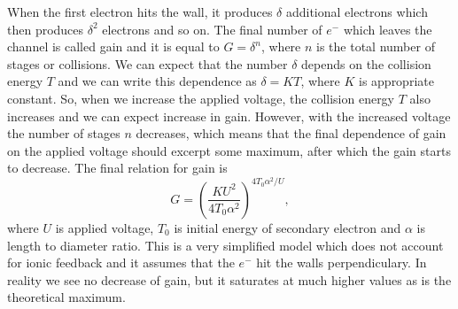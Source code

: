 When the first electron hits the wall, it produces $\delta$
additional electrons which then produces $\delta^2$ electrons and so on. The final number of $e^-$
which leaves the channel is called gain and it is equal to $G = \delta^n$, where $n$ is the total
number of stages or collisions. We can expect that the number $\delta$ depends on the collision
energy $T$ and we can write this dependence as $\delta = KT$, where $K$ is appropriate constant.
So, when we increase the applied voltage, the collision energy $T$ also increases and we can expect
increase in gain. However, with the increased voltage the number of stages $n$ decreases,
which means that the final dependence of gain on the applied voltage should excerpt some maximum,
after which the gain starts to decrease. The final relation for gain is
\begin{equation}
    G = \left(\frac{KU^2}{4T_0\alpha^2}\right)^{4T_0\alpha^2/U},
\end{equation}
where $U$ is applied voltage, $T_0$ is initial energy of secondary electron and $\alpha$ is length
to diameter ratio. This is a very simplified model which does not account for ionic feedback and it
assumes that the $e^-$ hit the walls perpendiculary. In reality we see no decrease of gain, but
it saturates at much higher values as is the theoretical maximum.
